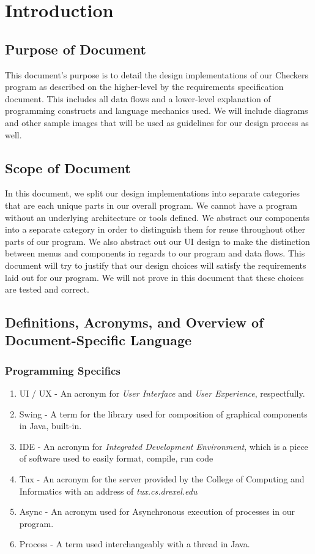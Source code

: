 \documentclass{scrreprt}
\begin{document}
\chapter{Introduction}
	\section{Purpose of Document}
	This document's purpose is to detail the design implementations of our Checkers program as described on the higher-level by the requirements specification document. This includes all data flows and a lower-level explanation of programming constructs and language mechanics used. We will include diagrams and other sample images that will be used as guidelines for our design process as well.

	\section{Scope of Document}
	In this document, we split our design implementations into separate categories that are each unique parts in our overall program. We cannot have a program without an underlying architecture or tools defined. We abstract our components into a separate category in order to distinguish them for reuse throughout other parts of our program. We also abstract out our UI design to make the distinction between menus and components in regards to our program and data flows. This document will try to justify that our design choices will satisfy the requirements laid out for our program. We will not prove in this document that these choices are tested and correct.

	\section{Definitions, Acronyms, and Overview of Document-Specific Language}
		\subsection {Programming Specifics}
			\begin{enumerate}
			\item UI / UX - An acronym for \textit{User Interface} and \textit{User Experience}, respectfully.
			\item Swing - A term for the library used for composition of graphical components in Java, built-in.
			\item IDE - An acronym for \textit{Integrated Development Environment}, which is a piece of software used to easily format, compile, run code
			\item Tux - An acronym for the server provided by the College of Computing and Informatics with an address of \textit{tux.cs.drexel.edu} 
			\item Async - An acronym used for Asynchronous execution of processes in our program.
			\item Process - A term used interchangeably with a thread in Java.
			\end{enumerate}
\end{document}
